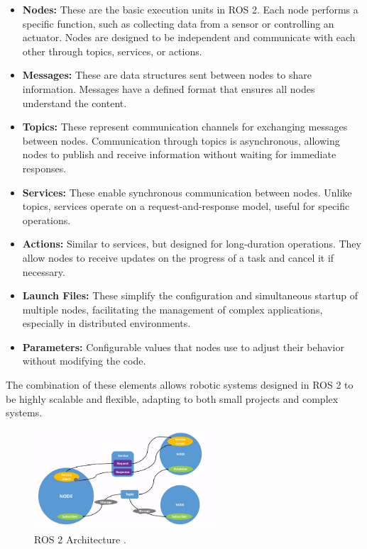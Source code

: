     \begin{itemize}
        \item \textbf{Nodes:} These are the basic execution units in ROS 2. Each node performs a specific function, such as collecting data from a sensor or controlling an actuator. Nodes are designed to be independent and communicate with each other through topics, services, or actions.  
        \item \textbf{Messages:} These are data structures sent between nodes to share information. Messages have a defined format that ensures all nodes understand the content.  
        \item \textbf{Topics:} These represent communication channels for exchanging messages between nodes. Communication through topics is asynchronous, allowing nodes to publish and receive information without waiting for immediate responses.  
        \item \textbf{Services:} These enable synchronous communication between nodes. Unlike topics, services operate on a request-and-response model, useful for specific operations.  
        \item \textbf{Actions:} Similar to services, but designed for long-duration operations. They allow nodes to receive updates on the progress of a task and cancel it if necessary.  
        \item \textbf{Launch Files:} These simplify the configuration and simultaneous startup of multiple nodes, facilitating the management of complex applications, especially in distributed environments.  
        \item \textbf{Parameters:} Configurable values that nodes use to adjust their behavior without modifying the code.  
    \end{itemize}
    
    The combination of these elements allows robotic systems designed in ROS 2 to be highly scalable and flexible, adapting to both small projects and complex systems.  
    
    \begin{figure}[H]
        \centering
        \includegraphics[width=0.6\textwidth]{pictures/ros2_arch.png}
        \caption{ROS 2 Architecture \cite{ros_docs}.}
        \label{fig:ros2_architecture}
    \end{figure}
    
